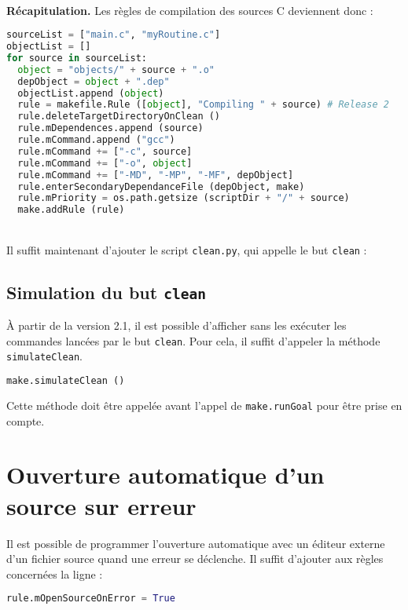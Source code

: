 \documentclass[a4paper,11pt]{extarticle}
\begin{document}
~\\{\bf Récapitulation.} Les règles de compilation des sources C deviennent donc :
\begin{lstlisting}[language=py]
sourceList = ["main.c", "myRoutine.c"]
objectList = []
for source in sourceList:
  object = "objects/" + source + ".o"
  depObject = object + ".dep"
  objectList.append (object)
  rule = makefile.Rule ([object], "Compiling " + source) # Release 2
  rule.deleteTargetDirectoryOnClean ()
  rule.mDependences.append (source)
  rule.mCommand.append ("gcc")
  rule.mCommand += ["-c", source]
  rule.mCommand += ["-o", object]
  rule.mCommand += ["-MD", "-MP", "-MF", depObject]
  rule.enterSecondaryDependanceFile (depObject, make)
  rule.mPriority = os.path.getsize (scriptDir + "/" + source)
  make.addRule (rule)
\end{lstlisting}

~\\Il suffit maintenant d'ajouter le script \texttt{clean.py}, qui appelle le but \texttt{clean} :



\subsection{Simulation du but \texttt{clean}}\label{simulationButClean}

À partir de la version 2.1, il est possible d'afficher sans les exécuter les commandes lancées par le but \texttt{clean}. Pour cela, il suffit d'appeler la méthode \texttt{simulateClean}.

\begin{lstlisting}[language=py]
  make.simulateClean ()
\end{lstlisting}

Cette méthode doit être appelée avant l'appel de \texttt{make.runGoal} pour être prise en compte.



\section{Ouverture automatique d'un source sur erreur}

Il est possible de programmer l'ouverture automatique avec un éditeur externe d'un fichier source quand une erreur se déclenche. Il suffit d'ajouter aux règles concernées la ligne :
\begin{lstlisting}[language=py]
  rule.mOpenSourceOnError = True
\end{lstlisting}
\end{document}
